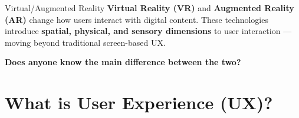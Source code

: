 \documentclass[aspectratio=169, table]{beamer}
\begin{document}
\begin{frame}{Virtual/Augmented Reality}
	\vspace{10pt}
	\textbf{Virtual Reality (VR)} and \textbf{Augmented Reality (AR)} change how users interact with digital content. These technologies introduce \textbf{spatial, physical, and sensory dimensions} to user interaction — moving beyond traditional screen-based UX.
	
	\vspace{10pt}
	\centering
	\large
	\textbf{Does anyone know the main difference between the two?}
\end{frame}


\section{What is User Experience (UX)?}
\end{document}
